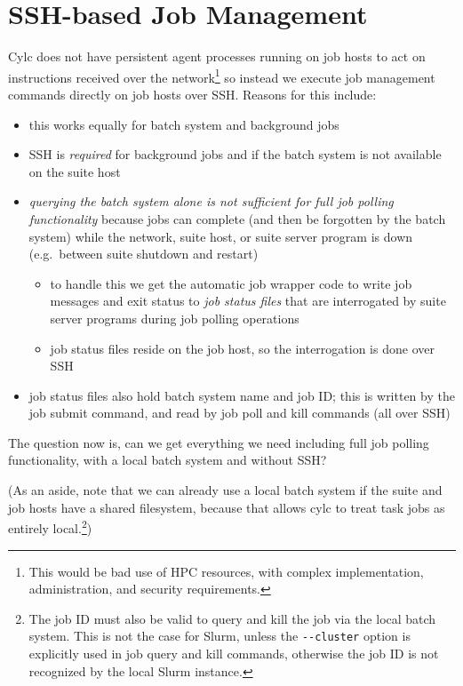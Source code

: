 \documentclass{article}
\begin{document}
\section{SSH-based Job Management}

Cylc does not have persistent agent processes running on job hosts to act on
instructions received over the network\footnote{This would be bad use of HPC
resources, with complex implementation, administration, and security
requirements.} so instead we execute job management commands directly on job
hosts over SSH. Reasons for this include:
\begin{itemize}
  \item this works equally for batch system and background jobs
  \item SSH is {\em required} for background jobs and if the batch system is
    not available on the suite host
  \item {\em querying the batch system alone is not sufficient for full job
    polling functionality} because jobs can complete (and then be forgotten by
    the batch system) while the network, suite host, or suite server program is
    down (e.g.\ between suite shutdown and restart)
    \begin{itemize}
      \item to handle this we get the automatic job wrapper code to write
        job messages and exit status to {\em job status files} that are
        interrogated by suite server programs during job polling operations
      \item job status files reside on the job host, so the interrogation
        is done over SSH
    \end{itemize}
  \item job status files also hold batch system name and job ID; this is
    written by the job submit command, and read by job poll and kill commands
    (all over SSH)
\end{itemize}

The question now is, can we get everything we need including full job polling
functionality, with a local batch system and without SSH?

(As an aside, note that we can already use a local batch system if the suite
and job hosts have a shared filesystem, because that allows cylc to treat task
jobs as entirely local.\footnote{The job ID must also be valid to query and
kill the job via the local batch system. This is not the case for Slurm, unless
the \lstinline=--cluster= option is explicitly used in job query and kill
commands, otherwise the job ID is not recognized by the local Slurm instance.})
\end{document}

